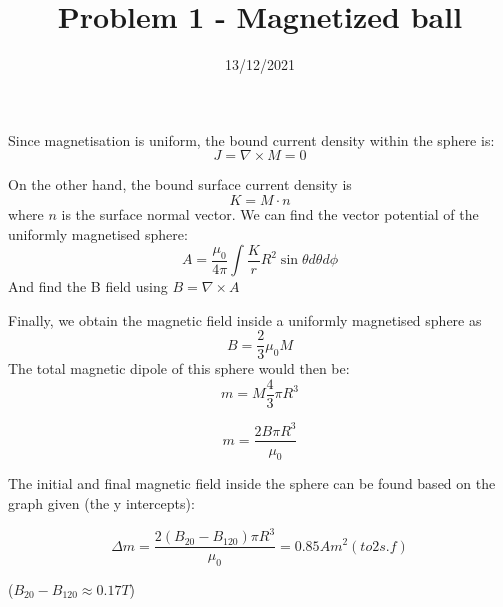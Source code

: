 \documentclass{article}
\title{Problem 1 - Magnetized ball}
\date{13/12/2021}
\begin{document}
\maketitle

Since magnetisation is uniform, the bound current density within the sphere is:
\begin{equation}
    J=\nabla \times M=0
\end{equation}

On the other hand, the bound surface current density is 
\begin{equation}
    K=M \cdot n
\end{equation}
where $n$ is the surface normal vector.
We can find the vector potential of the uniformly magnetised sphere:
\begin{equation}
    A= \frac{\mu_0}{4\pi} \int \frac{K}{r} R^2 \sin\theta d\theta d\phi
\end{equation}
And find the B field using $B=\nabla \times A$

Finally, we obtain the magnetic field inside a uniformly magnetised sphere as
\begin{equation}
    B=\frac{2}{3} \mu_0 M
\end{equation}
The total magnetic dipole of this sphere would then be:
\begin{equation}
    m=M \frac{4}{3} \pi R^3
\end{equation}

\begin{equation}
    m= \frac{2 B \pi R^3}{\mu_0}
\end{equation}

The initial and final magnetic field inside the sphere can be found based on the graph given (the y intercepts):

\begin{equation}
    \Delta m= \frac{2 (B_{20}-B_{120}) \pi R^3}{\mu_0}= \boxed{0.85 A m^2} (to 2 s.f) 
\end{equation}

($B_{20}-B_{120}\approx 0.17 T$)
\end{document}
